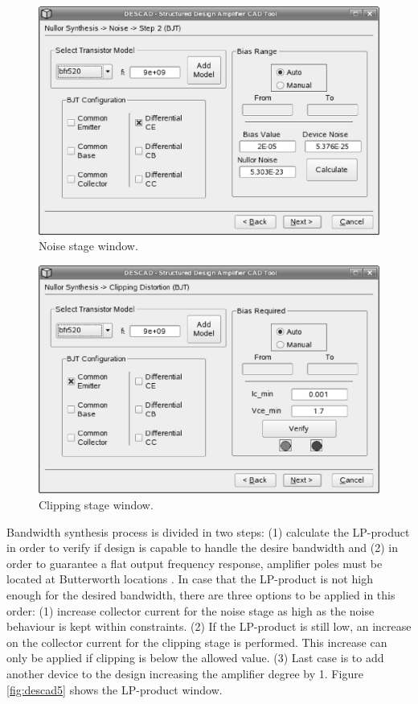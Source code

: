 \documentclass[twocolumn]{IEEEtran}
\begin{document}
\begin{figure}[hbtp]
	\centering
	\includegraphics[scale=0.3]{figuras/wizard3.eps}
	\caption{Noise stage window.}
	\label{fig:descad3}
\end{figure}

\begin{figure}[hbtp]
	\centering
	\includegraphics[scale=0.3]{figuras/wizard4.eps}
	\caption{Clipping stage window.}
	\label{fig:descad4}
\end{figure}

Bandwidth synthesis process is divided in two steps: (1) calculate the LP-product \cite{verhoeven} in order to verify if design is capable to handle the desire bandwidth and (2) in order to guarantee a flat output frequency response, amplifier poles must be located at Butterworth locations \cite{nordholt}. In case that the LP-product is not high enough for the desired bandwidth, there are three options to be applied in this order: (1) increase collector current for the noise stage as high as the noise behaviour is kept within constraints. (2) If the LP-product is still low, an increase on the collector current for the clipping stage is performed. This increase can only be applied if clipping is below the allowed value. (3) Last case is to add another device to the design increasing the amplifier degree by 1. Figure \ref{fig:descad5} shows the LP-product window.
\end{document}

